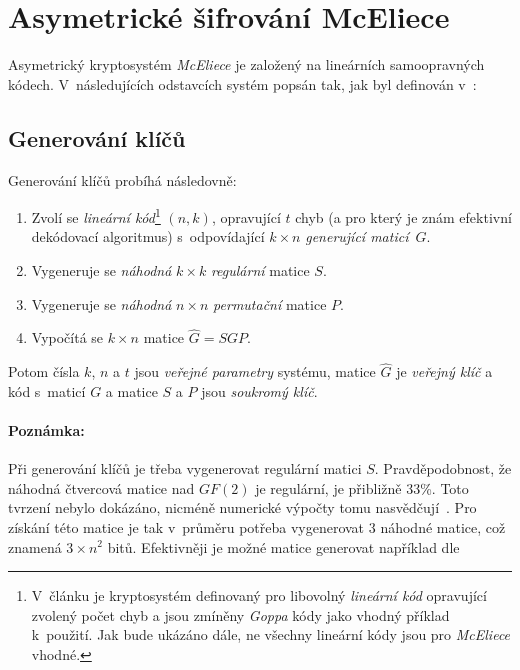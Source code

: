 \documentclass[thesis=M,czech,hidelinks]{FITthesis}[2012/06/26]
\newcommand{\0}{{\textcolor[gray]{0.80}{0}}}
\begin{document}
\section{Asymetrické šifrování McEliece}

Asymetrický kryptosystém \emph{McEliece} je založený na lineárních samoopravných
kódech. V~následujících odstavcích systém popsán tak, jak byl definován
v~\cite{McEliece}:

\subsection{Generování klíčů}

Generování klíčů probíhá následovně:

\begin{enumerate}
    \item Zvolí se \emph{lineární kód}\footnote{
            V~článku je kryptosystém definovaný pro libovolný \emph{lineární
            kód} opravující zvolený počet chyb a jsou zmíněny \emph{Goppa} kódy
            jako vhodný příklad k~použití. Jak bude ukázáno dále, ne všechny
            lineární kódy jsou pro \emph{McEliece} vhodné.
        } $(n,k)$, opravující $t$ chyb (a pro který je znám efektivní dekódovací
        algoritmus) s~odpovídající $k \times n$ \emph{generující maticí}~$G$.
    \item Vygeneruje se \emph{náhodná} $k \times k$ \emph{regulární} matice $S$.
    \item Vygeneruje se \emph{náhodná} $n \times n$ \emph{permutační} matice $P$.
    \item Vypočítá se $k \times n$ matice $\hat{G} = S G P$.
\end{enumerate}

Potom čísla $k$, $n$ a $t$ jsou \emph{veřejné parametry} systému, matice
$\hat{G}$ je \emph{veřejný klíč} a kód s~maticí $G$ a matice $S$ a $P$ jsou
\emph{soukromý klíč}.

\paragraph{Poznámka:} Při generování klíčů je třeba vygenerovat regulární matici
$S$. Pravděpodobnost, že náhodná čtvercová matice nad $GF(2)$ je regulární, je
přibližně $33$\;\%.  Toto tvrzení nebylo dokázáno, nicméně numerické výpočty
tomu nasvědčují~\cite{Heyse}. Pro získání této matice je tak v~průměru potřeba
vygenerovat $3$ náhodné matice, což znamená $3\times n^2$ bitů. Efektivněji je
možné matice generovat například dle~\cite{Randall}
\end{document}
